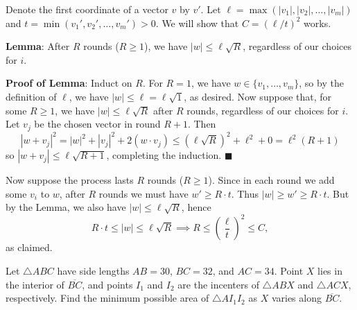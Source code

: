 \begin{solution}[name={Solution by Michael Tang}]
	Denote the first coordinate of a vector $v$ by $v'$. Let $\ell = \max(|v_1|, |v_2|, \ldots, |v_m|)$ and $t = \min(v_1', v_2', \ldots, v_m') > 0$. We will show that $C = (\ell / t)^2$ works.	
	
	\textbf{Lemma}: After $R$ rounds ($R \ge 1$), we have $|w| \le \ell \sqrt{R}$, regardless of our choices for $i$.
	
	\textbf{Proof of Lemma}: Induct on $R$. For $R = 1$, we have $w \in \{v_1, \ldots, v_m\}$, so by the definition of $\ell$, we have $|w| \le \ell = \ell\sqrt{1}$, as desired. Now suppose that, for some $R \ge 1$, we have $|w| \le \ell\sqrt{R}$ after $R$ rounds, regardless of our choices for $i$. Let $v_j$ be the chosen vector in round $R+1$. Then\[|w + v_j|^2 = |w|^2 + |v_j|^2 + 2(w \cdot v_j) \le (\ell \sqrt{R})^2 + \ell^2 + 0 = \ell^2(R+1)\]so $|w + v_j| \le \ell \sqrt{R+1}$, completing the induction. $\blacksquare$
	
	Now suppose the process lasts $R$ rounds ($R \ge 1$). Since in each round we add some $v_i$ to $w$, after $R$ rounds we must have $w' \ge R \cdot t$. Thus $|w| \ge w' \ge R \cdot t$. But by the Lemma, we also have $|w| \le \ell \sqrt{R}$, hence\[R \cdot t \le |w| \le \ell \sqrt{R} \implies R \le \left(\frac{\ell}{t}\right)^2 \le C,\]as claimed.
\end{solution}








\begin{question}[name={2018 AIME I, \href{https://artofproblemsolving.com/community/c4p9995418}{Problem 13}}]
	Let \(\triangle ABC\) have side lengths \(AB=30\), \(BC=32\), and \(AC=34\). Point \(X\) lies in the interior of \(\overline{BC}\), and points \(I_1\) and \(I_2\) are the incenters of \(\triangle ABX\) and \(\triangle ACX\), respectively. Find the minimum possible area of \(\triangle AI_1I_2\) as \( X\) varies along \(\overline{BC}\).
\end{question}


